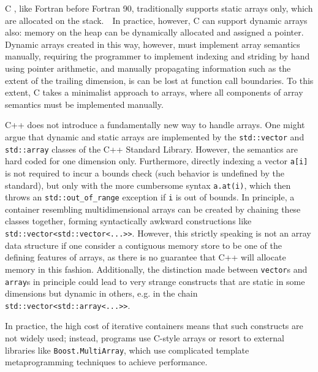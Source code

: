 \documentclass[preprint]{sigplanconf}
\newcommand{\code}[1]{\texttt{#1}}
\begin{document}

C \cite{Kernigham:1978cp}, like Fortran before Fortran 90, traditionally supports static arrays only, which are allocated on the stack.　In practice, however, C can support dynamic arrays also: memory on the heap can be dynamically allocated and assigned a pointer. Dynamic arrays created in this way, however, must implement array semantics manually, requiring the programmer to implement indexing and striding by hand using pointer arithmetic, and manually propagating information such as the extent of the trailing dimension, is can be lost at function call boundaries. To this extent, C takes a minimalist approach to arrays, where all components of array semantics must be implemented manually.


C++ does not introduce a fundamentally new way to handle arrays. One might argue that dynamic and static arrays are implemented by the \code{std::vector} and \code{std::array} classes of the C++ Standard Library. However, the semantics are hard coded for one dimension only. Furthermore, directly indexing a vector \code{a[i]} is not required to incur a bounds check (such behavior is undefined by the standard), but only with the more cumbersome syntax \code{a.at(i)}, which then throws an \code{std::out\_of\_range} exception if \code{i} is out of bounds. In principle, a container resembling multidimensional arrays can be created by chaining these classes together, forming syntactically awkward constructions like \code{std::vector<std::vector<...>>}. However, this strictly speaking is not an array data structure if one consider a contiguous memory store to be one of the defining features of arrays, as there is no guarantee that C++ will allocate memory in this fashion. Additionally, the distinction made between \code{vector}s and \code{array}s in principle could lead to very strange constructs that are static in some dimensions but dynamic in others, e.g. in the chain \code{std::vector<std::array<...>>}.

In practice, the high cost of iterative containers means that such constructs are not widely used; instead, programs use C-style arrays or resort to external libraries like \code{Boost.MultiArray}, which use complicated template metaprogramming techniques to achieve performance.
\end{document}
